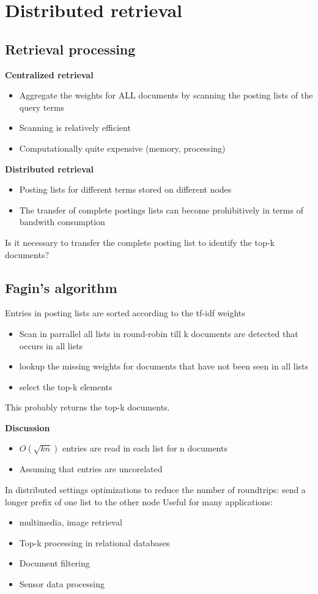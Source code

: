 \section{Distributed retrieval}
\subsection{Retrieval processing}

\textbf{Centralized retrieval}
\begin{itemize}
\item Aggregate the weights for ALL documents by scanning the posting
  lists of the query terms
\item Scanning is relatively efficient
\item Computationally quite expensive (memory, processing)
\end{itemize}

\textbf{Distributed retrieval}
\begin{itemize}
\item Posting lists for different terms stored on different nodes
\item The transfer of complete postings lists can become prohibitively
  in terms of bandwith consumption
\end{itemize}
Is it necessary to transfer the complete posting list to identify the
top-k documents?

\subsection{Fagin's algorithm}
Entries in posting lists are sorted according to the tf-idf weights
\begin{itemize}
\item Scan in parrallel all lists in round-robin till k documents are
  detected that occurs in all lists
\item lookup the missing weights for documents that have not been seen
  in all lists
\item select the top-k elements
\end{itemize}
This probably returns the top-k documents.

\textbf{Discussion}
\begin{itemize}
\item $ O(\sqrt{k n}) $ entries are read in each list for n
  documents
\item Assuming that entries are uncorelated
\end{itemize}

In distributed settings optimizations to reduce the number of
roundtrips: send a longer prefix of one list to the other node
Useful for many applications:
\begin{itemize}
\item multimedia, image retrieval
\item Top-k processing in relational databases
\item Document filtering
\item Sensor data processing
\end{itemize}


